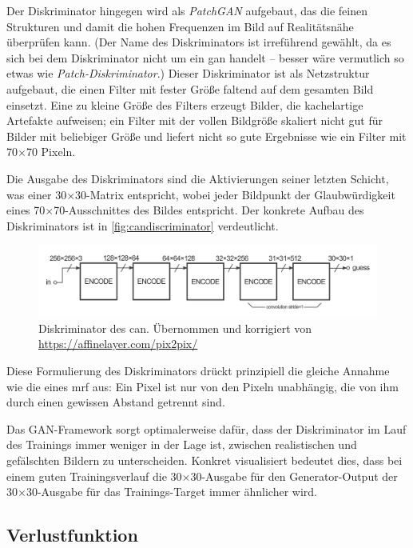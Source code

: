 Der Diskriminator hingegen wird als \emph{PatchGAN} aufgebaut, das die feinen Strukturen und damit die hohen Frequenzen im Bild auf Realitätsnähe überprüfen kann.
(Der Name des Diskriminators ist irreführend gewählt, da es sich bei dem Diskriminator nicht um ein \gls{gan} handelt -- besser wäre vermutlich so etwas wie \emph{Patch-Diskriminator}.)
Dieser Diskriminator ist als Netzstruktur aufgebaut, die einen Filter mit fester Größe faltend auf dem gesamten Bild einsetzt.
Eine zu kleine Größe des Filters erzeugt Bilder, die kachelartige Artefakte aufweisen; ein Filter mit der vollen Bildgröße skaliert nicht gut für Bilder mit beliebiger Größe und liefert nicht so gute Ergebnisse wie ein Filter mit 70$\times$70 Pixeln.

Die Ausgabe des Diskriminators sind die Aktivierungen seiner letzten Schicht, was einer 30$\times$30-Matrix entspricht, wobei jeder Bildpunkt der Glaubwürdigkeit eines 70$\times$70-Ausschnittes des Bildes entspricht.
Der konkrete Aufbau des Diskriminators ist in \autoref{fig:candiscriminator} verdeutlicht.

\begin{figure}
	\centering
	\includegraphics[width=0.9\linewidth]{img/can_discriminator}
	\caption[Diskriminator des \gls{can}]{Diskriminator des \gls{can}. Übernommen und korrigiert von \url{https://affinelayer.com/pix2pix/}}
	\label{fig:candiscriminator}
\end{figure}

Diese Formulierung des Diskriminators drückt prinzipiell die gleiche Annahme wie die eines \gls{mrf} aus:
Ein Pixel ist nur von den Pixeln unabhängig, die von ihm durch einen gewissen Abstand getrennt sind.

Das GAN-Framework sorgt optimalerweise dafür, dass der Diskriminator im Lauf des Trainings immer weniger in der Lage ist, zwischen realistischen und gefälschten Bildern zu unterscheiden.
Konkret visualisiert bedeutet dies, dass bei einem guten Trainingsverlauf die 30$\times$30-Ausgabe für den Generator-Output der 30$\times$30-Ausgabe für das Trainings-Target immer ähnlicher wird.



\subsection{Verlustfunktion}

